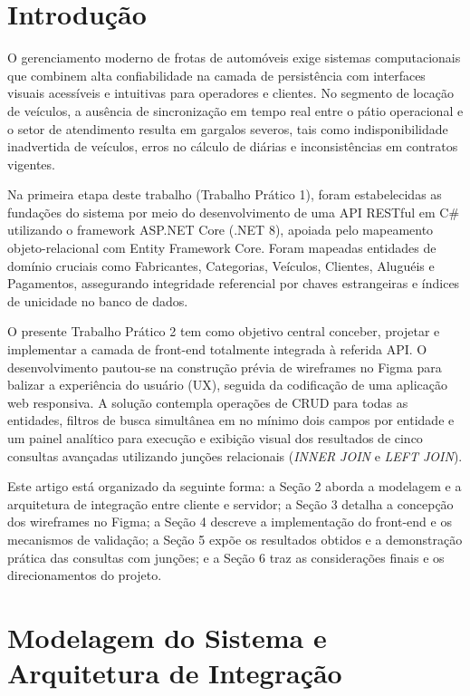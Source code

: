 \documentclass[12pt]{article}
\begin{document}
\section{Introdução}

O gerenciamento moderno de frotas de automóveis exige sistemas computacionais que combinem alta confiabilidade na camada de persistência com interfaces visuais acessíveis e intuitivas para operadores e clientes. No segmento de locação de veículos, a ausência de sincronização em tempo real entre o pátio operacional e o setor de atendimento resulta em gargalos severos, tais como indisponibilidade inadvertida de veículos, erros no cálculo de diárias e inconsistências em contratos vigentes.

Na primeira etapa deste trabalho (Trabalho Prático 1), foram estabelecidas as fundações do sistema por meio do desenvolvimento de uma API RESTful em C# utilizando o framework ASP.NET Core (.NET 8), apoiada pelo mapeamento objeto-relacional com Entity Framework Core. Foram mapeadas entidades de domínio cruciais como Fabricantes, Categorias, Veículos, Clientes, Aluguéis e Pagamentos, assegurando integridade referencial por chaves estrangeiras e índices de unicidade no banco de dados.

O presente Trabalho Prático 2 tem como objetivo central conceber, projetar e implementar a camada de front-end totalmente integrada à referida API. O desenvolvimento pautou-se na construção prévia de wireframes no Figma para balizar a experiência do usuário (UX), seguida da codificação de uma aplicação web responsiva. A solução contempla operações de CRUD para todas as entidades, filtros de busca simultânea em no mínimo dois campos por entidade e um painel analítico para execução e exibição visual dos resultados de cinco consultas avançadas utilizando junções relacionais (\textit{INNER JOIN} e \textit{LEFT JOIN}).

Este artigo está organizado da seguinte forma: a Seção 2 aborda a modelagem e a arquitetura de integração entre cliente e servidor; a Seção 3 detalha a concepção dos wireframes no Figma; a Seção 4 descreve a implementação do front-end e os mecanismos de validação; a Seção 5 expõe os resultados obtidos e a demonstração prática das consultas com junções; e a Seção 6 traz as considerações finais e os direcionamentos do projeto.

\section{Modelagem do Sistema e Arquitetura de Integração}
\end{document}
